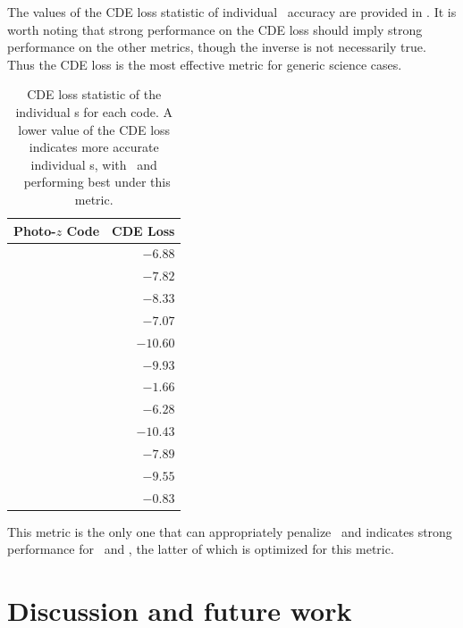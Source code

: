The values of the CDE loss statistic of individual \pzpdf\ accuracy are provided in .
It is worth noting that strong performance on the CDE loss should imply strong performance on the other metrics, though the inverse is not necessarily true.
Thus the CDE loss is the most effective metric for generic science cases.

\begin{table}  %
	\centering
	\caption{CDE loss statistic of the individual \pzpdf s for each code.
		A lower value of the CDE loss indicates more accurate individual \pzpdf s, with \cmnn\ and \flexzboost\ performing best under this metric.}
	\begin{tabular}{lr}
		\hline
		Photo-$z$ Code & CDE Loss \\
		\hline
		\annz 	    & $-6.88$ \\
		\bpz 		    & $-7.82$ \\
		\delight    & $-8.33$\\
		\eazy       & $-7.07$ \\
		\flexzboost & $-10.60$\\
		\gpz		    & $-9.93$ \\
		\lephare 	  & $-1.66$ \\
		\metaphor 	& $-6.28$ \\
		\cmnn       & $-10.43$ \\
		\skynet 	  & $-7.89$ \\
		\tpz 		    & $-9.55$ \\
		\hline
		\trainz		  & $-0.83$ \\
	\end{tabular}
\end{table}

This metric is the only one that can appropriately penalize \trainz\ and indicates strong performance for \cmnn\ and \flexzboost, the latter of which is optimized for this metric.

\section{Discussion and future work}

